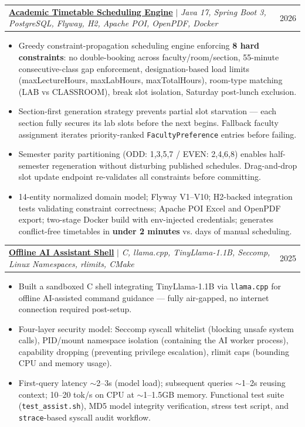\documentclass[letterpaper,10pt]{article}
\makeatletter
\newcommand{\resumeItem}[1]{
  \item\small{{#1 \vspace{-2pt}}}
}
\newcommand{\resumeProjectHeading}[2]{
    \item
    \begin{tabular*}{0.97\textwidth}{l@{\extracolsep{\fill}}r}
      \small#1 & \small#2 \\
    \end{tabular*}\vspace{-7pt}
}
\newcommand{\resumeItemListStart}{\begin{itemize}[leftmargin=0.2in, itemsep=-1pt, topsep=0pt]}
\newcommand{\resumeItemListEnd}{\end{itemize}\vspace{-4pt}}
\makeatother
\begin{document}
  \resumeProjectHeading
    {\textbf{\href{https://github.com/sharmavaibhav31/timetable_management}{Academic Timetable Scheduling Engine}} $|$ \textit{Java 17, Spring Boot 3, PostgreSQL, Flyway, H2, Apache POI, OpenPDF, Docker}}{2026}
  \resumeItemListStart
    \resumeItem{Greedy constraint-propagation scheduling engine enforcing \textbf{8 hard constraints}: no double-booking across faculty/room/section, 55-minute consecutive-class gap enforcement, designation-based load limits (maxLectureHours, maxLabHours, maxTotalHours), room-type matching (LAB vs CLASSROOM), break slot isolation, Saturday post-lunch exclusion.}
    \resumeItem{Section-first generation strategy prevents partial slot starvation — each section fully secures its lab slots before the next begins. Fallback faculty assignment iterates priority-ranked \texttt{FacultyPreference} entries before failing.}
    \resumeItem{Semester parity partitioning (ODD: 1,3,5,7 / EVEN: 2,4,6,8) enables half-semester regeneration without disturbing published schedules. Drag-and-drop slot update endpoint re-validates all constraints before committing.}
    \resumeItem{14-entity normalized domain model; Flyway V1--V10; H2-backed integration tests validating constraint correctness; Apache POI Excel and OpenPDF export; two-stage Docker build with env-injected credentials; generates conflict-free timetables in \textbf{under 2 minutes} vs. days of manual scheduling.}
  \resumeItemListEnd

  \resumeProjectHeading
    {\textbf{\href{https://github.com/sharmavaibhav31/mini-shell-C-programming}{Offline AI Assistant Shell}} $|$ \textit{C, llama.cpp, TinyLlama-1.1B, Seccomp, Linux Namespaces, rlimits, CMake}}{2025}
  \resumeItemListStart
    \resumeItem{Built a sandboxed C shell integrating TinyLlama-1.1B via \texttt{llama.cpp} for offline AI-assisted command guidance — fully air-gapped, no internet connection required post-setup.}
    \resumeItem{Four-layer security model: Seccomp syscall whitelist (blocking unsafe system calls), PID/mount namespace isolation (containing the AI worker process), capability dropping (preventing privilege escalation), rlimit caps (bounding CPU and memory usage).}
    \resumeItem{First-query latency $\sim$2--3s (model load); subsequent queries $\sim$1--2s reusing context; 10--20 tok/s on CPU at $\sim$1--1.5GB memory. Functional test suite (\texttt{test\_assist.sh}), MD5 model integrity verification, stress test script, and \texttt{strace}-based syscall audit workflow.}
  \resumeItemListEnd
\end{document}
